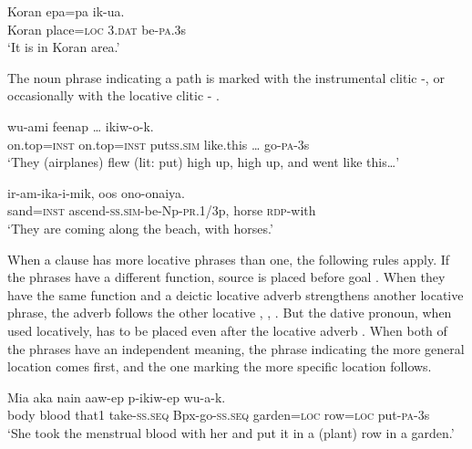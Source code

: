 \ea%
\label{ex:4:x1801}
\gll Koran  epa=pa    ik-ua. \\
    Koran  place=\textsc{loc}  3.\textsc{dat}  be-\textsc{pa}.3s  \\
\glt`It is in Koran area.'
\z

The noun phrase indicating a path is marked with the instrumental clitic -, or occasionally with the locative clitic - .

\ea%
\label{ex:4:x866}
\gll {}   wu-ami  feenap  {\dots}  ikiw-o-k. \\
  on.top=\textsc{inst}  on.top=\textsc{inst}  put\textsc{ss}.\textsc{sim}  like.this  {\dots}  go-\textsc{pa}-3s    \\
\glt`They (airplanes) flew (lit: put) high up, high up, and went like this{\dots}'
\z

\ea%
\label{ex:4:x867}
\gll {}  ir-am-ika-i-mik,  oos  ono-onaiya. \\
   sand=\textsc{inst}  ascend-\textsc{ss}.\textsc{sim}-be-Np-\textsc{pr}.1/3p,  horse  \textsc{rdp}-with   \\
\glt`They are coming along the beach, with horses.'
\z

When a clause has more locative phrases than one, the following rules apply. If  the phrases have a different function, source is placed before goal . When they have the same function and a deictic locative adverb strengthens another locative phrase, the adverb follows the other locative , , . But  the dative pronoun, when used locatively, has to be placed even after the locative adverb . When both of the phrases have an independent meaning, the phrase indicating the more general location comes first, and the one marking the more specific location follows.

\ea%
\label{ex:4:x868}
\gll Mia  aka  nain  aaw-ep  p-ikiw-ep     wu-a-k.\\
   body  blood  that1  take-\textsc{ss}.\textsc{seq}  Bpx-go-\textsc{ss}.\textsc{seq}  garden=\textsc{loc}    row=\textsc{loc}  put-\textsc{pa}-3s  \\
\glt`She took the menstrual blood with her and put it in a (plant) row in a garden.'
\z

